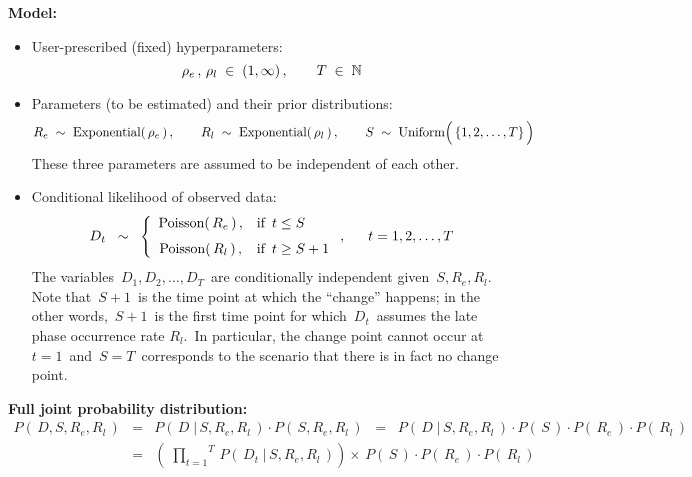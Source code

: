 \vskip 0.5cm
\noindent
\textbf{Model:}
\begin{itemize}
\item
	User-prescribed (fixed) hyperparameters:
	\begin{equation*}
	\rho_{e}\,,\, \rho_{l} \; \in \; (1,\infty)\,,
	\quad\quad
	T \; \in \; \mathbb{N}
	\end{equation*}
\item
	Parameters (to be estimated) and their prior distributions:
	\begin{equation*}
	R_{e} \;\sim\; \textnormal{Exponential}(\,\rho_{e}\,)\,,
	\quad\quad
	R_{l} \;\sim\; \textnormal{Exponential}(\,\rho_{l}\,)\,,
	\quad\quad
	S \;\sim\; \textnormal{Uniform}\!\left(\,\{\overset{{\color{white}.}}{1},2,\ldots,T\}\,\right)
	\end{equation*}
	These three parameters are assumed to be independent of each other.
\item
	Conditional likelihood of observed data:
	\begin{equation*}
	D_{t}
	\;\; \sim \;\;
		\left\{\begin{array}{cl}
		\textnormal{Poisson}(\,R_{e}\,)\,, & \textnormal{if \,$t \leq S$}
		\\
		\overset{{\color{white}1}}{\textnormal{Poisson}(\,R_{l}\,)}\,, & \textnormal{if \,$t \geq S + 1$}
		\end{array}\right.,
	\quad\;\;
	t = 1, 2, \ldots, T
	\end{equation*}
	The variables \,$D_{1}, D_{2}, \ldots, D_{T}$\, are conditionally independent given \,$S,R_{e},R_{l}$.
	\vskip 0.1cm
	{\color{red}Note that \,$S + 1$\, is the time point at which the ``change'' happens;
	in the other words, \,$S + 1$\, is the first time point
	for which \,$D_{t}$\, assumes the late phase occurrence rate $R_{l}$.\,
	\vskip 0.1cm
	In particular, the change point cannot occur at \,$t =1$\, and
	\,$S = T$\, corresponds to the scenario that there is in fact no change point.}
\end{itemize}


\vskip 0.5cm
\noindent
\textbf{Full joint probability distribution:}
\begin{eqnarray*}
P\!\left(\,D,S,R_{e},R_{l}\,\right)
& = &
	P\!\left(\,D \;\vert\, S,R_{e},R_{l}\,\right)
	\cdot
	P\!\left(\,S,R_{e},R_{l}\,\right)
\;\; = \;\;
	P\!\left(\,D \;\vert\, S,R_{e},R_{l}\,\right)
	\cdot
	P\!\left(\,S\,\right)
	\cdot
	P\!\left(\,R_{e}\,\right)
	\cdot
	P\!\left(\,R_{l}\,\right)
\\
& = &
	\left(\;
		\overset{T}{\underset{t=1}{\prod}}\,
		P\!\left(\,D_{t} \;\vert\, S,R_{e},R_{l}\,\right)
		\right)
	\times\,
	P\!\left(\,S\,\right)
	\cdot
	P\!\left(\,R_{e}\,\right)
	\cdot
	P\!\left(\,R_{l}\,\right)
\end{eqnarray*}

